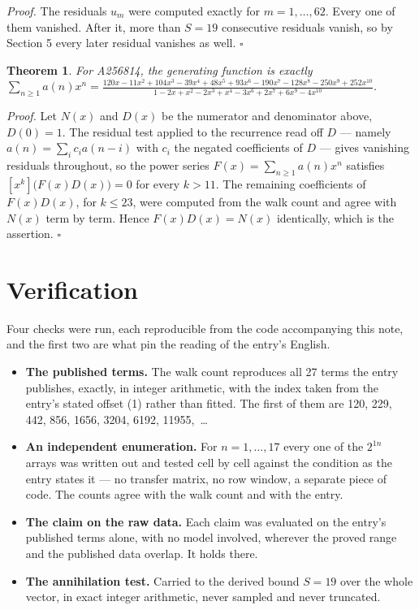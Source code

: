 \documentclass[11pt]{article}
\newtheorem{theorem}{Theorem}
\theoremstyle{definition}
\begin{document}
{\itshape Proof.} The residuals $u_m$ were computed exactly for $m = 1,\dots,62$. Every one of them vanished. After it, more than $S = 19$ consecutive residuals vanish, so by Section 5 every later residual vanishes as well. $\square$

\begin{theorem} For A256814, the generating function is exactly $\sum_{n\ge 1} a(n)x^n = \frac{120x - 11x^{2} + 104x^{3} - 39x^{4} + 48x^{5} + 93x^{6} - 190x^{7} - 128x^{8} - 250x^{9} + 252x^{10}}{1 - 2x + x^{2} - 2x^{3} + x^{4} - 3x^{6} + 2x^{7} + 6x^{9} - 4x^{10}}$.\end{theorem}

{\itshape Proof.} Let $N(x)$ and $D(x)$ be the numerator and denominator above, $D(0)=1$. The residual test applied to the recurrence read off $D$ --- namely $a(n) = \sum_i c_i a(n-i)$ with $c_i$ the negated coefficients of $D$ --- gives vanishing residuals throughout, so the power series $F(x)=\sum_{n\ge 1}a(n)x^n$ satisfies $[x^k]\bigl(F(x)D(x)\bigr) = 0$ for every $k > 11$. The remaining coefficients of $F(x)D(x)$, for $k \le 23$, were computed from the walk count and agree with $N(x)$ term by term. Hence $F(x)D(x) = N(x)$ identically, which is the assertion. $\square$

\section{Verification}

Four checks were run, each reproducible from the code accompanying this note, and the first two are what pin the reading of the entry's English.

\begin{itemize}

\item {\bfseries The published terms.} The walk count reproduces all 27 terms the entry publishes, exactly, in integer arithmetic, with the index taken from the entry's stated offset (1) rather than fitted. The first of them are 120, 229, 442, 856, 1656, 3204, 6192, 11955,~\dots

\item {\bfseries An independent enumeration.} For $n = 1,\dots,17$ every one of the $2^{1n}$ arrays was written out and tested cell by cell against the condition as the entry states it --- no transfer matrix, no row window, a separate piece of code. The counts agree with the walk count and with the entry.

\item {\bfseries The claim on the raw data.} Each claim was evaluated on the entry's published terms alone, with no model involved, wherever the proved range and the published data overlap. It holds there.

\item {\bfseries The annihilation test.} Carried to the derived bound $S = 19$ over the whole vector, in exact integer arithmetic, never sampled and never truncated.

\end{itemize}
\end{document}
